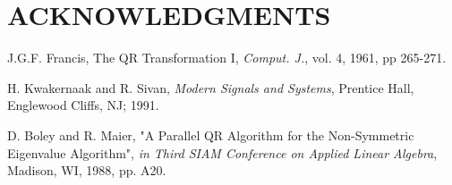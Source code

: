 \documentclass[letterpaper, 10 pt, conference]{ieeeconf}  %
\begin{document}
\section{ACKNOWLEDGMENTS}



\begin{thebibliography}{99}

J.G.F. Francis, The QR Transformation I, {\it Comput. J.}, vol. 4, 1961, pp 265-271.

H. Kwakernaak and R. Sivan, {\it Modern Signals and Systems}, Prentice Hall, Englewood Cliffs, NJ; 1991.

D. Boley and R. Maier, "A Parallel QR Algorithm for the Non-Symmetric Eigenvalue Algorithm", {\it in Third SIAM Conference on Applied Linear Algebra}, Madison, WI, 1988, pp. A20.

\end{thebibliography}
\end{document}
